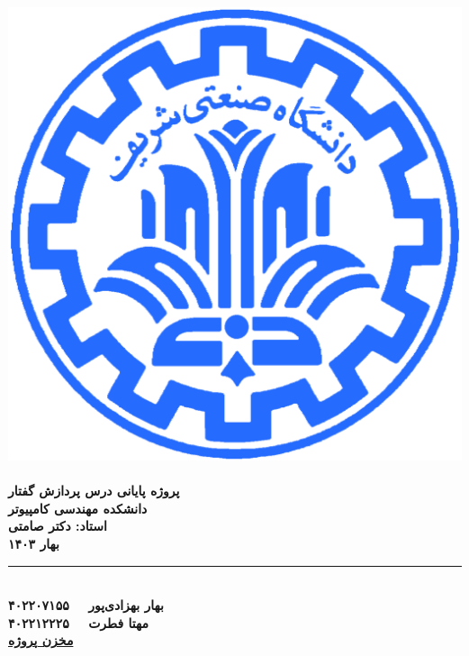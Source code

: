 \documentclass[fleqn]{report}
\begin{document}
\begin{titlepage}
    \begin{center}
        \includegraphics{sharif.png}\\
        \vspace{1cm}    \textbf{\LARGE   {}}\\
        \vspace{1cm}  \textbf{\Large  پروژه پایانی درس پردازش گفتار}\\
        \vspace{1cm}    \textbf{\large  دانشکده مهندسی کامپیوتر}\\
        \vspace{0.5cm}  \textbf{\large  استاد: دکتر صامتی}\\
        \vspace{0.5cm}  \textbf{\large  بهار ۱۴۰۳}\\
        \vspace{0.5cm}  \noindent\rule{8cm}{0.4pt}\\
        \vspace{2cm}    \textbf{\large بهار بهزادی‌پور \ \   ۴۰۲۲۰۷۱۵۵}\\
        \vspace{0.5cm}    \textbf{\large مهتا فطرت \ \   ۴۰۲۲۱۲۲۲۵}\\
        \vspace{2cm}    \textbf{\large \href{https://github.com/MahtaFetrat/Speech-Enhancement-and-Denoisnig}{مخزن پروژه}}\\
    \end{center}
\end{titlepage}
\end{document}
